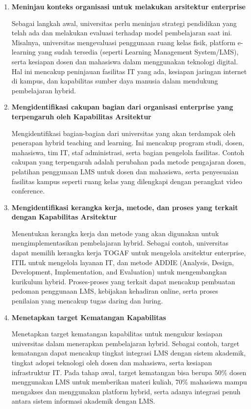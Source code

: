 \begin{enumerate}
	\item \textbf{Meninjau konteks organisasi untuk melakukan arsitektur enterprise}
	
	Sebagai langkah awal, universitas perlu meninjau strategi pendidikan yang telah ada dan melakukan evaluasi terhadap model pembelajaran saat ini. Misalnya, universitas mengevaluasi penggunaan ruang kelas fisik, platform e-learning yang sudah tersedia (seperti Learning Management System/LMS), serta kesiapan dosen dan mahasiswa dalam menggunakan teknologi digital. Hal ini mencakup peninjauan fasilitas IT yang ada, kesiapan jaringan internet di kampus, dan kapabilitas sumber daya manusia dalam mendukung pembelajaran hybrid.
	
	\item \textbf{Mengidentifikasi cakupan bagian dari organisasi enterprise yang terpengaruh oleh Kapabilitas Arsitektur}
	
	Mengidentifikasi bagian-bagian dari universitas yang akan terdampak oleh penerapan hybrid teaching and learning. Ini mencakup program studi, dosen, mahasiswa, tim IT, staf administrasi, serta bagian pengelola fasilitas. Contoh cakupan yang terpengaruh adalah perubahan pada metode pengajaran dosen, pelatihan penggunaan LMS untuk dosen dan mahasiswa, serta penyesuaian fasilitas kampus seperti ruang kelas yang dilengkapi dengan perangkat video conference.
	
	\item \textbf{Mengidentifikasi kerangka kerja, metode, dan proses yang terkait dengan Kapabilitas Arsitektur}
	
	Menentukan kerangka kerja dan metode yang akan digunakan untuk mengimplementasikan pembelajaran hybrid. Sebagai contoh, universitas dapat memilih kerangka kerja TOGAF untuk mengelola arsitektur enterprise, ITIL untuk mengelola layanan IT, dan metode ADDIE (Analysis, Design, Development, Implementation, and Evaluation) untuk mengembangkan kurikulum hybrid. Proses-proses yang terkait dapat mencakup pembuatan pedoman penggunaan LMS, kebijakan kehadiran online, serta proses penilaian yang mencakup tugas daring dan luring.
	
	\item \textbf{Menetapkan target Kematangan Kapabilitas}
	
	Menetapkan target kematangan kapabilitas untuk mengukur kesiapan universitas dalam menerapkan pembelajaran hybrid. Sebagai contoh, target kematangan dapat mencakup tingkat integrasi LMS dengan sistem akademik, tingkat adopsi teknologi oleh dosen dan mahasiswa, serta kesiapan infrastruktur IT. Pada tahap awal, target kematangan bisa berupa 50\% dosen menggunakan LMS untuk memberikan materi kuliah, 70\% mahasiswa mampu mengakses dan menggunakan platform hybrid, serta adanya integrasi penuh antara sistem informasi akademik dengan LMS.
\end{enumerate}

